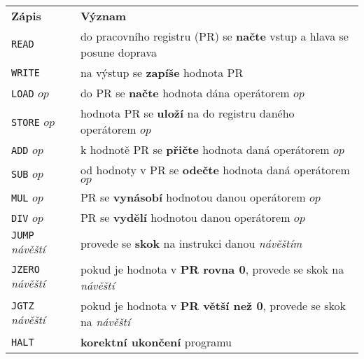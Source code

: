 \begin{table}[H]
    \centering
    \begin{tabular}{l|l}
        \textbf{Zápis}                  & \textbf{Význam}                                                                 \\ \hhline
        \texttt{READ}                   & do pracovního registru (PR) se \textbf{načte} vstup a hlava se posune
        doprava                                                                                                           \\
        \texttt{WRITE}                  & na výstup se \textbf{zapíše} hodnota PR                                         \\
        \texttt{LOAD} $op$              & do PR se \textbf{načte} hodnota dána operátorem $op$                            \\
        \texttt{STORE} $op$             & hodnota PR se \textbf{uloží} na do registru daného operátorem $op$              \\
        \texttt{ADD} $op$               & k hodnotě PR se \textbf{přičte} hodnota daná operátorem $op$                    \\
        \texttt{SUB} $op$               & od hodnoty v PR se \textbf{odečte} hodnota daná operátorem $op$                 \\
        \texttt{MUL} $op$               & PR se \textbf{vynásobí} hodnotou danou operátorem $op$                          \\
        \texttt{DIV} $op$               & PR se \textbf{vydělí} hodnotou danou operátorem $op$                            \\
        \texttt{JUMP} \textit{návěští}  & provede se \textbf{skok} na instrukci danou \textit{návěštím}                   \\
        \texttt{JZERO} \textit{návěští} & pokud je hodnota v \textbf{PR rovna 0}, provede se skok na \textit{návěští}     \\
        \texttt{JGTZ} \textit{návěští}  & pokud je hodnota v \textbf{PR větší než 0}, provede se skok na \textit{návěští} \\
        \texttt{HALT}                   & \textbf{korektní ukončení} programu                                             \\
    \end{tabular}
\end{table}

